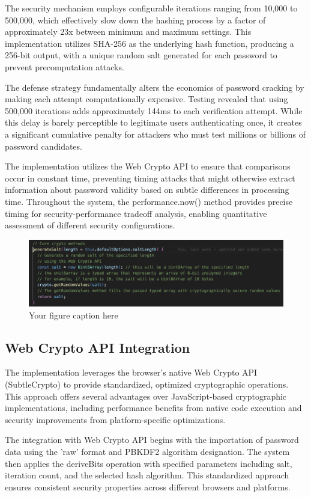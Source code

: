 \documentclass[11pt,a4paper]{article}
\begin{document}
The security mechanism employs configurable iterations ranging from 10,000 to 500,000, which effectively slow down the hashing process by a factor of approximately 23x between minimum and maximum settings. This implementation utilizes SHA-256 as the underlying hash function, producing a 256-bit output, with a unique random salt generated for each password to prevent precomputation attacks.

The defense strategy fundamentally alters the economics of password cracking by making each attempt computationally expensive. Testing revealed that using 500,000 iterations adds approximately 144ms to each verification attempt. While this delay is barely perceptible to legitimate users authenticating once, it creates a significant cumulative penalty for attackers who must test millions or billions of password candidates.

The implementation utilizes the Web Crypto API to ensure that comparisons occur in constant time, preventing timing attacks that might otherwise extract information about password validity based on subtle differences in processing time. Throughout the system, the performance.now() method provides precise timing for security-performance tradeoff analysis, enabling quantitative assessment of different security configurations.
\begin{figure}[htbp]
  \centering
  \includegraphics[width=1\linewidth]{images/Salt.png}
  \caption{Your figure caption here}
  \label{fig:your-label}
\end{figure}
\subsection{Web Crypto API Integration}
The implementation leverages the browser's native Web Crypto API (SubtleCrypto) to provide standardized, optimized cryptographic operations. This approach offers several advantages over JavaScript-based cryptographic implementations, including performance benefits from native code execution and security improvements from platform-specific optimizations.

The integration with Web Crypto API begins with the importation of password data using the 'raw' format and PBKDF2 algorithm designation. The system then applies the deriveBits operation with specified parameters including salt, iteration count, and the selected hash algorithm. This standardized approach ensures consistent security properties across different browsers and platforms.
\end{document}
